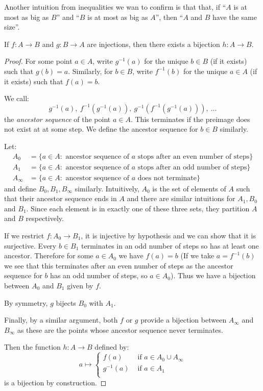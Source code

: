 \documentclass[../main.tex]{subfiles}
\begin{document}
Another intuition from inequalities we wan to confirm is that that, if ``$A$ is at most as big as $B$'' and ``$B$ is at most as big as $A$'', then
``$A$ and $B$ have the same size''.
\begin{theorem}
  If $f: A \to B$ and $g: B \to A$ are injections, then there exists a bijection $h: A \to B$. \label{schroderBerstein}
\end{theorem}
\begin{proof}
  For some point $a \in A$, write $g^{-1}(a)$ for the unique $b \in B$ (if it exists) such that $g(b) = a$.
  Similarly, for $b \in B$, write $f^{-1}(b)$ for the unique $a \in A$ (if it exists) such that $f(a) = b$.

  We call:
  \[
    g^{-1}(a),\ f^{-1}(g^{-1}(a)),\ g^{-1}(f^{-1}(g^{-1}(a))),\ \ldots
  \]
  the \textit{ancestor sequence} of the point $a \in A$.
  This terminates if the preimage does not exist at at some step.
  We define the ancestor sequence for $b \in B$ similarly.

  Let:
  \begin{align*}
    A_0 &= \{a \in A : \text{ ancestor sequence of $a$ stops after an even number of steps}\} \\
    A_1 &= \{a \in A : \text{ ancestor sequence of $a$ stops after an odd number of steps}\} \\
    A_{\infty} &= \{a \in A : \text{ ancestor sequence of $a$ does not terminate}\}
  \end{align*}
  and define $B_0, B_1, B_{\infty}$ similarly.
  Intuitively, $A_0$ is the set of elements of $A$ such that their ancestor sequence ends in $A$ and there are similar intuitions for $A_1, B_0$ and $B_1$.
  Since each element is in exactly one of these three sets, they partition $A$ and $B$ respectively.

  If we restrict $f: A_0 \to B_1$, it is injective by hypothesis and we can show that it is surjective.
  Every $b \in B_1$ terminates in an odd number of steps so has at least one ancestor.
  Therefore for some $a \in A_0$ we have $f(a) = b$ (If we take $a = f^{-1}(b)$ we see that this terminates after an even number of steps as the ancestor sequence for $b$ has an odd number of steps, so $a \in A_0$).
  Thus we have a bijection between $A_0$ and $B_1$ given by $f$.

  By symmetry, $g$ bijects $B_0$ with $A_1$.

  Finally, by a similar argument, both $f$ or $g$ provide a bijection between $A_{\infty}$ and $B_{\infty}$ as these are the points whose ancestor sequence never terminates.

  Then the function $h: A \to B$ defined by:
  \[
    a \mapsto \begin{cases}
    f(a) & \text{ if } a \in A_0 \cup A_{\infty} \\
    g^{-1}(a) & \text{ if } a \in A_1 \\
    \end{cases}
  \]
  is a bijection by construction.
\end{proof}
\end{document}

